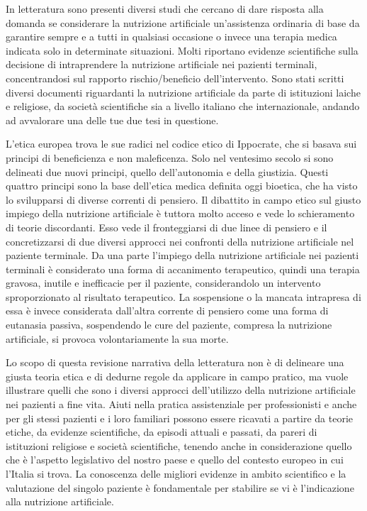 \documentclass[11pt,a4paper,oneside]{book}
\begin{document}
In letteratura sono presenti diversi studi che cercano di dare risposta alla domanda se considerare la nutrizione artificiale un'assistenza ordinaria di base da garantire sempre e a tutti in qualsiasi occasione o invece una terapia medica indicata solo in determinate situazioni. Molti riportano evidenze scientifiche sulla decisione di intraprendere la nutrizione artificiale nei pazienti terminali, concentrandosi sul rapporto rischio/beneficio dell'intervento. 
Sono stati scritti diversi documenti riguardanti la nutrizione artificiale da parte di istituzioni laiche e religiose, da societ\`a scientifiche sia a livello italiano che internazionale, andando ad avvalorare una delle tue due tesi in questione. 

L'etica europea trova le sue radici nel codice etico di Ippocrate, che si basava sui principi di beneficienza e non maleficenza.  Solo nel ventesimo secolo si sono delineati due nuovi principi, quello dell'autonomia e della giustizia. Questi quattro principi sono la base dell'etica medica definita oggi bioetica, che ha visto lo svilupparsi di diverse correnti di pensiero. 
Il dibattito in campo etico sul giusto impiego della nutrizione artificiale \`e tuttora molto acceso e vede lo schieramento di teorie discordanti. Esso vede il fronteggiarsi di due linee di pensiero e il concretizzarsi di due diversi approcci nei confronti della nutrizione artificiale nel paziente terminale. Da una parte l'impiego della nutrizione artificiale nei pazienti terminali \`e considerato una forma di accanimento terapeutico, quindi una terapia gravosa, inutile e inefficacie per il paziente, considerandolo un intervento sproporzionato al risultato terapeutico. La sospensione o la mancata intrapresa di essa \`e invece considerata dall'altra corrente di pensiero come una forma di eutanasia passiva, sospendendo le cure del paziente, compresa la nutrizione artificiale, si provoca volontariamente la sua morte. 

Lo scopo di questa revisione narrativa della letteratura non \`e di delineare una giusta teoria etica e di dedurne regole da applicare in campo pratico, ma vuole illustrare quelli che sono i diversi approcci dell'utilizzo della nutrizione artificiale nei pazienti a fine vita. Aiuti nella pratica assistenziale per professionisti e anche per gli stessi pazienti e i loro familiari possono essere ricavati a partire da teorie etiche, da evidenze scientifiche, da episodi attuali e passati, da pareri di istituzioni religiose e societ\`a scientifiche, tenendo anche in considerazione quello che \`e l'aspetto legislativo del nostro paese e quello del contesto europeo in cui l'Italia si trova. 
La conoscenza delle migliori evidenze in ambito scientifico e la valutazione del singolo paziente \`e fondamentale per stabilire  se vi \`e l'indicazione alla nutrizione artificiale. 
\end{document}
